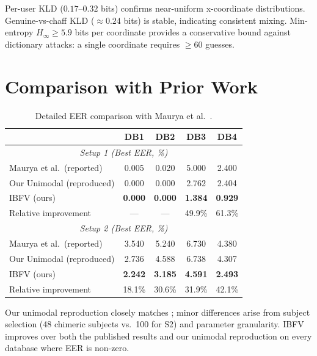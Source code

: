 Per-user KLD ($0.17$--$0.32$ bits) confirms near-uniform x-coordinate distributions.
Genuine-vs-chaff KLD ($\approx 0.24$ bits) is stable, indicating consistent mixing.
Min-entropy $H_\infty \geq 5.9$ bits per coordinate provides a conservative bound
against dictionary attacks: a single coordinate requires $\geq 60$ guesses.

\section{Comparison with Prior Work}
\label{sec:comparison_results}

\begin{table}[h]
\centering
\caption{Detailed EER comparison with Maurya et al.\ \cite{maurya2025enhancing}.}
\label{tab:comparison}
\small
\begin{tabular}{@{}l cccc@{}}
\toprule
 & \textbf{DB1} & \textbf{DB2} & \textbf{DB3} & \textbf{DB4} \\
\midrule
\multicolumn{5}{c}{\textit{Setup 1 (Best EER, \%)}} \\
\midrule
Maurya et al.\ (reported)   & 0.005 & 0.020 & 5.000 & 2.400 \\
Our Unimodal (reproduced)   & 0.000 & 0.000 & 2.762 & 2.404 \\
IBFV (ours)                 & \textbf{0.000} & \textbf{0.000} & \textbf{1.384} & \textbf{0.929} \\
Relative improvement        & --- & --- & 49.9\% & 61.3\% \\
\midrule
\multicolumn{5}{c}{\textit{Setup 2 (Best EER, \%)}} \\
\midrule
Maurya et al.\ (reported)   & 3.540 & 5.240 & 6.730 & 4.380 \\
Our Unimodal (reproduced)   & 2.736 & 4.588 & 6.738 & 4.307 \\
IBFV (ours)                 & \textbf{2.242} & \textbf{3.185} & \textbf{4.591} & \textbf{2.493} \\
Relative improvement        & 18.1\% & 30.6\% & 31.9\% & 42.1\% \\
\bottomrule
\end{tabular}
\end{table}

Our unimodal reproduction closely matches \cite{maurya2025enhancing}; minor
differences arise from subject selection (48 chimeric subjects vs.\ 100 for S2)
and parameter granularity. IBFV improves over both the published results and our
unimodal reproduction on every database where EER is non-zero.

